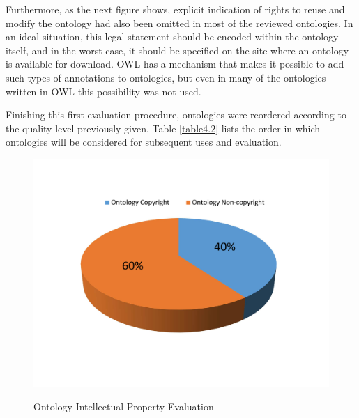 Furthermore, as the next figure shows, explicit indication of rights to reuse and modify the ontology had also been omitted in most of the reviewed ontologies. In an ideal situation, this legal statement should be encoded within the ontology itself, and in the worst case, it should be specified on the site where an ontology is available for download. OWL has a mechanism that makes it possible to add such types of annotations to ontologies, but even in many of the ontologies written in OWL this possibility was not used.

Finishing this first evaluation procedure, ontologies were reordered according to the quality level previously given. Table \ref{table4.2} lists the order in which ontologies will be considered for subsequent uses and evaluation. 



\begin{figure}
	\begin{center}
		\includegraphics[scale=0.4]{figure-chapterIV/fig4-4}\\
		\vspace{-20}
		\caption{Ontology Intellectual Property Evaluation}
		\label{figure4-4}
	\end{center}
\end{figure}






